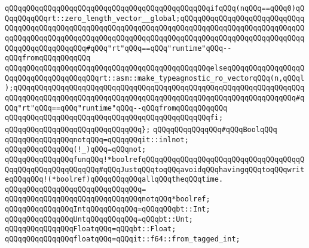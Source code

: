 \newline
\verb|qQQqqQQqqQQqqQQqqQQqqQQqqQQqqQQqqQQqqQQqqQQqqQQqifqQQq(nqQQq==qQQq0)qQQqqQQqqQQqrt::zero_length_vector__global;qQQqqQQqqQQqqQQqqQQqqQQqqQQqqQQqqQQqqQQqqQQqqQQqqQQqqQQqqQQqqQQqqQQqqQQqqQQqqQQqqQQqqQQqqQQqqQQqqQQqqQQqqQQqqQQqqQQqqQQqqQQqqQQqqQQqqQQqqQQqqQQqqQQqqQQqqQQqqQQqqQQqqQQqqQQqqQQqqQQqqQQqqQQq#qQQq"rt"qQQq==qQQq"runtime"qQQq--qQQqfromqQQqqQQqqQQq|\newline
\verb|qQQqqQQqqQQqqQQqqQQqqQQqqQQqqQQqqQQqqQQqqQQqqQQqelseqQQqqQQqqQQqqQQqqQQqqQQqqQQqqQQqqQQqqQQqrt::asm::make_typeagnostic_ro_vectorqQQq(n,qQQql);qQQqqQQqqQQqqQQqqQQqqQQqqQQqqQQqqQQqqQQqqQQqqQQqqQQqqQQqqQQqqQQqqQQqqQQqqQQqqQQqqQQqqQQqqQQqqQQqqQQqqQQqqQQqqQQqqQQqqQQqqQQqqQQqqQQqqQQq#qQQq"rt"qQQq==qQQq"runtime"qQQq--qQQqfromqQQqqQQqqQQq|\newline
\verb|qQQqqQQqqQQqqQQqqQQqqQQqqQQqqQQqqQQqqQQqqQQqqQQqfi;|\newline
\verb|qQQqqQQqqQQqqQQqqQQqqQQqqQQqqQQq};|\newline
\newline
\newline
\verb|qQQqqQQqqQQqqQQq#qQQqBoolqQQq|\newline
\verb|qQQqqQQqqQQqqQQqnotqQQq=qQQqqQQqit::inlnot;|\newline
\verb|qQQqqQQqqQQqqQQq(!_)qQQq=qQQqnot;|\newline
\newline
\verb|qQQqqQQqqQQqqQQqfunqQQq!*boolrefqQQqqQQqqQQqqQQqqQQqqQQqqQQqqQQqqQQqqQQqqQQqqQQqqQQqqQQqqQQq#qQQqJustqQQqtoqQQqavoidqQQqhavingqQQqtoqQQqwriteqQQqqQQq!(*boolref)qQQqqQQqqQQqallqQQqtheqQQqtime.|\newline
\verb|qQQqqQQqqQQqqQQqqQQqqQQqqQQqqQQq=|\newline
\verb|qQQqqQQqqQQqqQQqqQQqqQQqqQQqqQQqnotqQQq*boolref;|\newline
\newline
\verb|qQQqqQQqqQQqqQQqIntqQQqqQQqqQQq=qQQqqQQqbt::Int;|\newline
\verb|qQQqqQQqqQQqqQQqUntqQQqqQQqqQQq=qQQqbt::Unt;|\newline
\verb|qQQqqQQqqQQqqQQqFloatqQQq=qQQqbt::Float;|\newline
\newline
\verb|qQQqqQQqqQQqqQQqfloatqQQq=qQQqit::f64::from_tagged_int;|\newline
\newline
